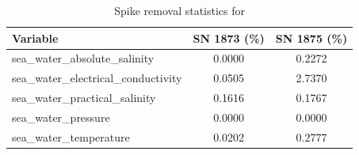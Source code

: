 \begin{table}[h]
\centering
\caption{Spike removal statistics for \projectname{} \casenumber{}}
\label{tab:spike_stats}
\begin{tabular}{|l|c|c|}
\hline
Variable & SN 1873 (\%) & SN 1875 (\%) \\
\hline
sea\_water\_absolute\_salinity & 0.0000 & 0.2272 \\
sea\_water\_electrical\_conductivity & 0.0505 & 2.7370 \\
sea\_water\_practical\_salinity & 0.1616 & 0.1767 \\
sea\_water\_pressure & 0.0000 & 0.0000 \\
sea\_water\_temperature & 0.0202 & 0.2777 \\
\hline
\end{tabular}
\end{table}
